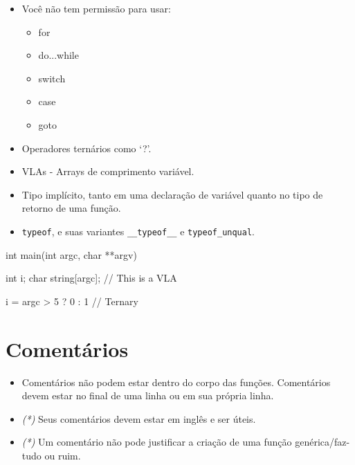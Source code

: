 \documentclass{42-pt}
\begin{document}
        \begin{itemize}

            \item Você não tem permissão para usar:

                \begin{itemize}

                    \item for
                    \item do...while
                    \item switch
                    \item case
                    \item goto

                \end{itemize}

            \item Operadores ternários como `?'.

            \item VLAs - Arrays de comprimento variável.

            \item Tipo implícito, tanto em uma declaração de variável quanto no tipo de
        retorno de uma função.

        \item \texttt{typeof}, e suas variantes \texttt{\_\_typeof\_\_} e
        \texttt{typeof\_unqual}.

        \end{itemize}

\vspace{1cm}

        \begin{42ccode}
    int main(int argc, char **argv)
    {
        int     i;
        char    string[argc]; // This is a VLA

        i = argc > 5 ? 0 : 1 // Ternary
    }
        \end{42ccode}
        \newpage

    \section{Comentários}

        \begin{itemize}

        \item Comentários não podem estar dentro do corpo das funções.
            Comentários devem estar no final de uma linha ou em sua própria linha.

        \item \textit{(*)} Seus comentários devem estar em inglês e ser úteis.

        \item \textit{(*)} Um comentário não pode justificar a criação de uma função genérica/faz-tudo ou ruim.

        \end{itemize}
\end{document}
